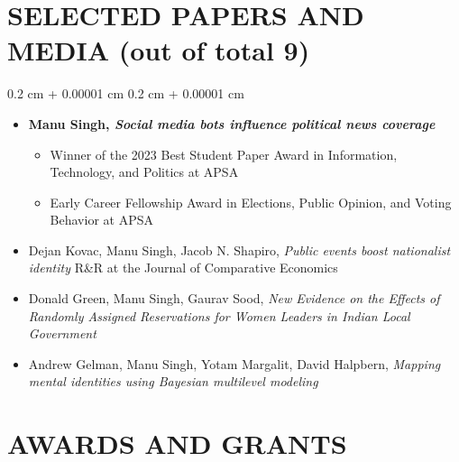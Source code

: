 \documentclass[10pt, letterpaper]{article}
\newenvironment{highlights}{
    \begin{itemize}[
        topsep=0.10 cm,
        parsep=0.10 cm,
        partopsep=0pt,
        itemsep=0pt,
        leftmargin=0.4 cm + 10pt
    ]
}{
    \end{itemize}
} %
\newenvironment{onecolentry}{
    \begin{adjustwidth}{
        0.2 cm + 0.00001 cm
    }{
        0.2 cm + 0.00001 cm
    }
}{
    \end{adjustwidth}
} %
\begin{document}
    \section{SELECTED PAPERS AND MEDIA (out of total 9)}
    \vspace{-0.2 cm}
        \begin{samepage}
            \begin{onecolentry}
            \begin{highlights}
                \item \textbf{Manu Singh, \textit{Social media bots influence political news coverage}}
                \begin{highlights}
                \vspace{-0.2 cm}
                    \item Winner of the 2023 Best Student Paper Award in Information, Technology, and Politics at APSA
                    \item Early Career Fellowship Award in Elections, Public Opinion, and Voting Behavior at APSA
                \end{highlights}
                \vspace{-0.2 cm}

                \item Dejan Kovac, Manu Singh, Jacob N. Shapiro, \textit{Public events boost nationalist identity} {R\&R at the Journal of Comparative Economics}

                \item Donald Green, Manu Singh, Gaurav Sood, \textit{New Evidence on the Effects of Randomly Assigned Reservations for Women Leaders in Indian Local Government}

                \item Andrew Gelman, Manu Singh, Yotam Margalit, David Halpbern, \textit{Mapping mental identities using Bayesian multilevel modeling}
            \end{highlights}
            \end{onecolentry}
        \end{samepage}

    \section{AWARDS AND GRANTS}
    \vspace{-0.2 cm}
\end{document}
